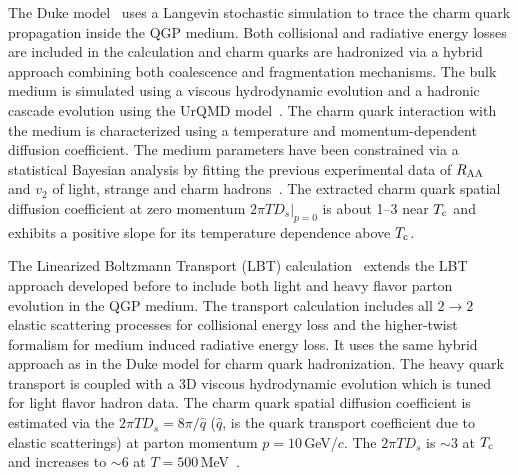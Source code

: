 \documentclass[%
 reprint,	
 amsmath,amssymb,
 aps,
 prc,
]{revtex4-1}
\begin{document}
The Duke model~\cite{Duke,Xu:2017obm,DukePrivateCom} uses a Langevin stochastic simulation to trace the charm quark propagation inside the QGP medium. Both collisional and radiative energy losses are included in the calculation and charm quarks are hadronized via a hybrid approach combining both coalescence and fragmentation mechanisms. The bulk medium is simulated using a viscous hydrodynamic evolution and a hadronic cascade evolution using the UrQMD model~\cite{urQMD}. The charm quark interaction with the medium is characterized using a temperature and momentum-dependent diffusion coefficient. The medium parameters have been constrained via a statistical Bayesian analysis by fitting the previous experimental data of $R_{\rm AA}$ and $v_{2}$ of light, strange and charm hadrons~\cite{Xu:2017obm}. The extracted charm quark spatial diffusion coefficient at zero momentum $2\pi TD_s|_{p=0}$ is about 1--3 near $T_{\rm c}$ and exhibits a positive slope for its temperature dependence above $T_{\rm c}$.

The Linearized Boltzmann Transport (LBT) calculation~\cite{Cao:2016gvr} extends the LBT approach developed before to include both light and heavy flavor parton evolution in the QGP medium. The transport calculation includes all $2\rightarrow 2$ elastic scattering processes for collisional energy loss and the higher-twist formalism for medium induced radiative energy loss. It uses the same hybrid approach as in the Duke model for charm quark hadronization. The heavy quark transport is coupled with a 3D viscous hydrodynamic evolution which is tuned for light flavor hadron data. The charm quark spatial diffusion coefficient is estimated via the $2\pi TD_s =8\pi/\hat{q}$ ($\hat{q}$, is the quark transport coefficient due to elastic scatterings) at parton momentum $p = 10$\,GeV/$c$. The $2\pi TD_s$ is $\sim$3 at $T_{\rm c}$ and increases to $\sim$6 at $T = 500$\,MeV~\cite{LBT:private}.
\end{document}
